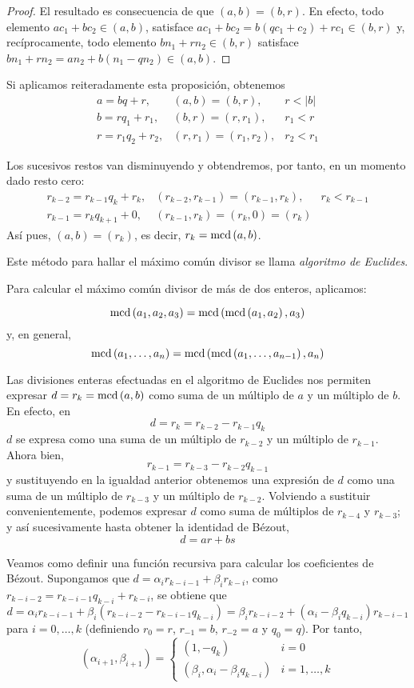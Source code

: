 \begin{proof}
    El resultado es consecuencia de que $(a,b)=(b,r)$. En efecto, todo elemento $ac_1+bc_2\in (a,b)$, satisface $ac_1+bc_2=b(qc_1+c_2)+rc_1\in (b,r)$ y, recíprocamente, todo elemento $bn_1+rn_2\in(b,r)$ satisface $bn_1+rn_2=an_2+b(n_1-qn_2)\in (a,b)$.
\end{proof}

Si aplicamos reiteradamente esta proposición, obtenemos
$$\begin{array}{lll}
    a = bq + r,       & (a,b)=(b,r),       & r<|b|   \\
    b = rq_1 + r_1,   & (b,r)=(r,r_1),     & r_1<r   \\
    r = r_1q_2 + r_2, & (r,r_1)=(r_1,r_2), & r_2<r_1
\end{array}$$

Los sucesivos restos van disminuyendo y obtendremos, por tanto, en un momento dado resto cero:
$$\begin{array}{lll}
    r_{k-2} = r_{k-1}q_k + r_k, & (r_{k-2},r_{k-1})=(r_{k-1},r_k),  & r_k<r_{k-1}   \\
    r_{k-1} = r_kq_{k+1} + 0,   & (r_{k-1},r_k)=(r_k,0)=(r_k)       & 
\end{array}$$
Así pues, $(a,b)=(r_k)$, es decir, $r_k=\operatorname{\rm mcd}\left(a,b\right)$.

Este método para hallar el máximo común divisor se llama {\it algoritmo de Euclides}.

Para calcular el máximo común divisor de más de dos enteros, aplicamos:

\begin{ejer}
    $$\operatorname{\rm mcd}\left(a_1,a_2,a_3\right)=\operatorname{\rm mcd}\left(\operatorname{\rm mcd}\left(a_1,a_2\right),a_3\right)$$
    y, en general,
    $$\operatorname{\rm mcd}\left(a_1,\dots,a_n\right)=\operatorname{\rm mcd}\left(\operatorname{\rm mcd}\left(a_1,\dots,a_{n-1}\right),a_n\right)$$
\end{ejer}

Las divisiones enteras efectuadas en el algoritmo de Euclides nos permiten expresar $d=r_k=\operatorname{\rm mcd}\left(a,b\right)$ como suma de un múltiplo de $a$ y un múltiplo de $b$. En efecto, en
$$d=r_k=r_{k-2}-r_{k-1}q_k$$
$d$ se expresa como una suma de un múltiplo de $r_{k-2}$ y un múltiplo de $r_{k-1}$. Ahora bien, 
$$r_{k-1}=r_{k-3}-r_{k-2}q_{k-1}$$
y sustituyendo en la igualdad anterior obtenemos una expresión de $d$ como una suma de un múltiplo de $r_{k-3}$ y un múltiplo de $r_{k-2}$. Volviendo a sustituir convenientemente, podemos expresar $d$ como suma de múltiplos de $r_{k-4}$ y $r_{k-3}$; y así sucesivamente hasta obtener la identidad de Bézout,
$$d=ar+bs$$

Veamos como definir una función recursiva para calcular los coeficientes de Bézout. Supongamos que $d=\alpha_i r_{k-i-1} + \beta_i r_{k-i}$, como $r_{k-i-2}=r_{k-i-1}q_{k-i}+r_{k-i}$, se obtiene que
$$d=\alpha_i r_{k-i-1}+\beta_i(r_{k-i-2}-r_{k-i-1}q_{k-i})=\beta_i r_{k-i-2}+(\alpha_i -\beta_i q_{k-i})r_{k-i-1} $$
para $i=0,\dots,k$ (definiendo $r_0=r$, $r_{-1}=b$, $r_{-2}=a$ y $q_0=q$). Por tanto,
$$(\alpha_{i+1},\beta_{i+1})=\begin{cases}
    (1, -q_k) & i=0 \\
    (\beta_i, \alpha_i-\beta_iq_{k-i}) & i = 1,\dots,k
\end{cases}$$


